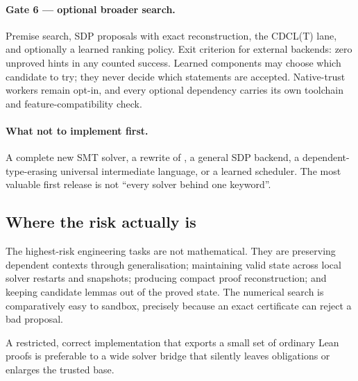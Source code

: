 \paragraph{Gate 6 --- optional broader search.}
Premise search, SDP proposals with exact reconstruction, the CDCL(T) lane, and
optionally a learned ranking policy. Exit criterion for external backends: zero
unproved hints in any counted success. Learned components may choose which
candidate to try; they never decide which statements are accepted.
Native-trust workers remain opt-in, and every optional dependency carries its own
toolchain and feature-compatibility check.

\paragraph{What not to implement first.}
A complete new SMT solver, a rewrite of \grind{}, a general SDP backend, a
dependent-type-erasing universal intermediate language, or a learned scheduler.
The most valuable first release is not ``every solver behind one keyword''.

\subsection{Where the risk actually is}

The highest-risk engineering tasks are not mathematical. They are preserving
dependent contexts through generalisation; maintaining valid state across local
solver restarts and snapshots; producing compact proof reconstruction; and
keeping candidate lemmas out of the proved state. The numerical search is
comparatively easy to sandbox, precisely because an exact certificate can reject
a bad proposal.

A restricted, correct implementation that exports a small set of ordinary Lean
proofs is preferable to a wide solver bridge that silently leaves obligations or
enlarges the trusted base.
